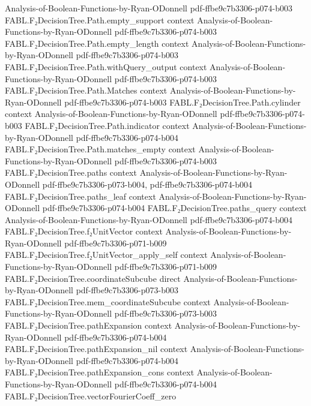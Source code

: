 \begin{theorem}
  {Analysis-of-Boolean-Functions-by-Ryan-ODonnell}
  {pdf-ffbe9c7b3306-p074-b003}
\proofstep
  {FABL.F₂DecisionTree.Path.empty_support}
  {context}
  {Analysis-of-Boolean-Functions-by-Ryan-ODonnell}
  {pdf-ffbe9c7b3306-p074-b003}
\proofstep
  {FABL.F₂DecisionTree.Path.empty_length}
  {context}
  {Analysis-of-Boolean-Functions-by-Ryan-ODonnell}
  {pdf-ffbe9c7b3306-p074-b003}
\proofstep
  {FABL.F₂DecisionTree.Path.withQuery_output}
  {context}
  {Analysis-of-Boolean-Functions-by-Ryan-ODonnell}
  {pdf-ffbe9c7b3306-p074-b003}
\proofstep
  {FABL.F₂DecisionTree.Path.Matches}
  {context}
  {Analysis-of-Boolean-Functions-by-Ryan-ODonnell}
  {pdf-ffbe9c7b3306-p074-b003}
\proofstep
  {FABL.F₂DecisionTree.Path.cylinder}
  {context}
  {Analysis-of-Boolean-Functions-by-Ryan-ODonnell}
  {pdf-ffbe9c7b3306-p074-b003}
\proofstep
  {FABL.F₂DecisionTree.Path.indicator}
  {context}
  {Analysis-of-Boolean-Functions-by-Ryan-ODonnell}
  {pdf-ffbe9c7b3306-p074-b004}
\proofstep
  {FABL.F₂DecisionTree.Path.matches_empty}
  {context}
  {Analysis-of-Boolean-Functions-by-Ryan-ODonnell}
  {pdf-ffbe9c7b3306-p074-b003}
\proofstep
  {FABL.F₂DecisionTree.paths}
  {context}
  {Analysis-of-Boolean-Functions-by-Ryan-ODonnell}
  {pdf-ffbe9c7b3306-p073-b004,
    pdf-ffbe9c7b3306-p074-b004}
\proofstep
  {FABL.F₂DecisionTree.paths_leaf}
  {context}
  {Analysis-of-Boolean-Functions-by-Ryan-ODonnell}
  {pdf-ffbe9c7b3306-p074-b004}
\proofstep
  {FABL.F₂DecisionTree.paths_query}
  {context}
  {Analysis-of-Boolean-Functions-by-Ryan-ODonnell}
  {pdf-ffbe9c7b3306-p074-b004}
\proofstep
  {FABL.F₂DecisionTree.f₂UnitVector}
  {context}
  {Analysis-of-Boolean-Functions-by-Ryan-ODonnell}
  {pdf-ffbe9c7b3306-p071-b009}
\proofstep
  {FABL.F₂DecisionTree.f₂UnitVector_apply_self}
  {context}
  {Analysis-of-Boolean-Functions-by-Ryan-ODonnell}
  {pdf-ffbe9c7b3306-p071-b009}
\proofstep
  {FABL.F₂DecisionTree.coordinateSubcube}
  {direct}
  {Analysis-of-Boolean-Functions-by-Ryan-ODonnell}
  {pdf-ffbe9c7b3306-p073-b003}
\proofstep
  {FABL.F₂DecisionTree.mem_coordinateSubcube}
  {context}
  {Analysis-of-Boolean-Functions-by-Ryan-ODonnell}
  {pdf-ffbe9c7b3306-p073-b003}
\proofstep
  {FABL.F₂DecisionTree.pathExpansion}
  {context}
  {Analysis-of-Boolean-Functions-by-Ryan-ODonnell}
  {pdf-ffbe9c7b3306-p074-b004}
\proofstep
  {FABL.F₂DecisionTree.pathExpansion_nil}
  {context}
  {Analysis-of-Boolean-Functions-by-Ryan-ODonnell}
  {pdf-ffbe9c7b3306-p074-b004}
\proofstep
  {FABL.F₂DecisionTree.pathExpansion_cons}
  {context}
  {Analysis-of-Boolean-Functions-by-Ryan-ODonnell}
  {pdf-ffbe9c7b3306-p074-b004}
\proofstep
  {FABL.F₂DecisionTree.vectorFourierCoeff_zero}

\end{theorem}
